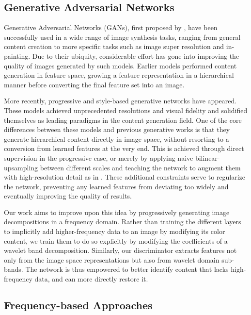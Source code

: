 \documentclass[final]{CVPR2021/cvpr}
\begin{document}
\subsection{Generative Adversarial Networks}

Generative Adversarial Networks (GANs), first proposed by \citet{goodfellow_generative_2014}, have been successfully used in a wide range of image synthesis tasks, ranging from general content creation to more specific tasks such as image super resolution and in-painting. Due to their ubiquity, considerable effort has gone into improving the quality of images generated by such models. Earlier models \citep{radford2015unsupervised,chen2016infogan,mirza2014conditional} performed content generation in feature space, growing a feature representation in a hierarchical manner before converting the final feature set into an image.

More recently, progressive \citep{karras2017progressive} and style-based \citep{karras_style-based_2019,karras2020analyzing} generative networks have appeared. These models achieved unprecedented resolutions and visual fidelity and solidified themselves as leading paradigms in the content generation field. One of the core differences between these models and previous generative works is that they generate hierarchical content directly in image space, without resorting to a conversion from learned features at the very end. This is achieved through direct supervision in the progressive case, or merely by applying naive bilinear-upsampling between different scales and teaching the network to augment them with high-resolution detail as in \citet{karras2020analyzing}. These additional constraints serve to regularize the network, preventing any learned features from deviating too widely and eventually improving the quality of results.

Our work aims to improve upon this idea by progressively generating image decompositions in a frequency domain. Rather than training the different layers to implicitly add higher-frequency data to an image by modifying its color content, we train them to do so explicitly by modifying the coefficients of a wavelet band decomposition. Similarly, our discriminator extracts features not only from the image space representations but also from wavelet domain sub-bands. The network is thus empowered to better identify content that lacks high-frequency data, and can more directly restore it.

\subsection{Frequency-based Approaches}
\end{document}
